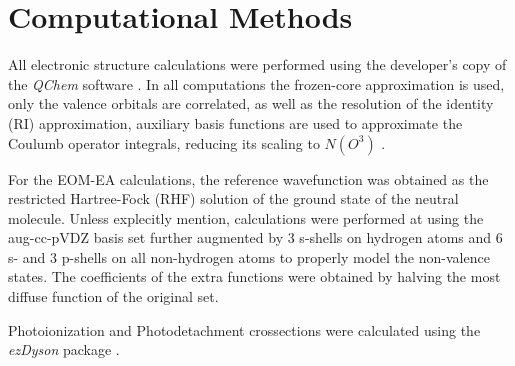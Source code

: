 \chapter{Computational Methods}\label{ch:methods}

All electronic structure calculations were performed using the developer's copy of the \textit{QChem} software \cite{QChem5}. In all computations the frozen-core
approximation is used, only the valence orbitals are correlated, as well as the resolution of the identity (RI) approximation, auxiliary basis functions are used to approximate the Coulumb operator integrals, reducing its scaling to $N(O^3)$ \cite{hattig2000cc2}.

For the EOM-EA calculations, the reference wavefunction was obtained as the restricted Hartree-Fock (RHF) solution of the ground state of the neutral molecule. Unless explecitly mention, calculations were performed at using the aug-cc-pVDZ basis set \cite{dunning1989gaussian} further augmented by 3 s-shells on hydrogen atoms and 6 s- and 3 p-shells on all non-hydrogen atoms \cite{paran2024performance} to properly model the non-valence states. The coefficients of the extra functions were obtained by halving the most diffuse function of the original set.

Photoionization and Photodetachment crossections were calculated using the \textit{ezDyson} package \cite{gozem2022ezspectra,gozem2015photoionization}.






\cleardoublepage


